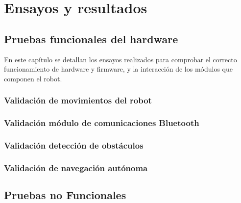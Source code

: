 
\chapter{Ensayos y resultados} %

\label{Chapter4} %


\section{Pruebas funcionales del hardware}
\label{sec:pruebasHW}

En este capítulo se detallan los ensayos realizados para comprobar el correcto funcionamiento de hardware y firmware, y la interacción de los módulos que componen el robot.

\subsection{Validación de movimientos del robot}
\subsection{Validación módulo de comunicaciones Bluetooth}
\subsection{Validación detección de obstáculos}
\subsection{Validación de navegación autónoma}


\section{Pruebas no Funcionales}
